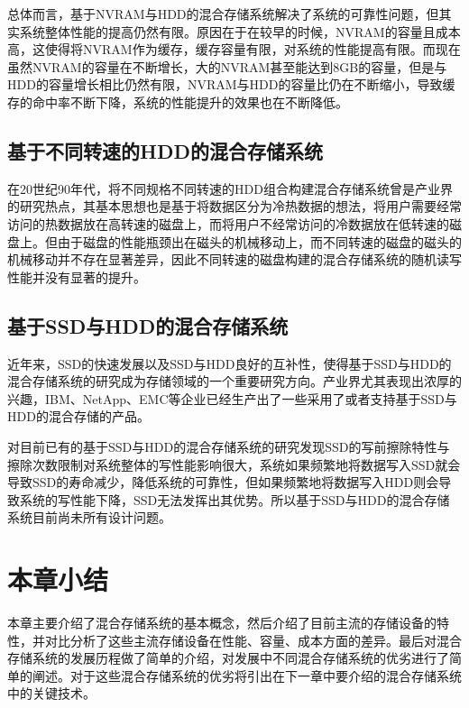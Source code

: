 总体而言，基于NVRAM与HDD的混合存储系统解决了系统的可靠性问题，但其实系统整体性能的提高仍然有限。原因在于在较早的时候，NVRAM的容量且成本高，这使得将NVRAM作为缓存，缓存容量有限，对系统的性能提高有限。而现在虽然NVRAM的容量在不断增长，大的NVRAM甚至能达到8GB的容量，但是与HDD的容量增长相比仍然有限，NVRAM与HDD的容量比仍在不断缩小，导致缓存的命中率不断下降，系统的性能提升的效果也在不断降低。

\subsection{基于不同转速的HDD的混合存储系统}

在20世纪90年代，将不同规格不同转速的HDD组合构建混合存储系统曾是产业界的研究热点，其基本思想也是基于将数据区分为冷热数据的想法，将用户需要经常访问的热数据放在高转速的磁盘上，而将用户不经常访问的冷数据放在低转速的磁盘上。但由于磁盘的性能瓶颈出在磁头的机械移动上，而不同转速的磁盘的磁头的机械移动并不存在显著差异，因此不同转速的磁盘构建的混合存储系统的随机读写性能并没有显著的提升。

\subsection{基于SSD与HDD的混合存储系统}

近年来，SSD的快速发展以及SSD与HDD良好的互补性，使得基于SSD与HDD的混合存储系统的研究成为存储领域的一个重要研究方向。产业界尤其表现出浓厚的兴趣，IBM\cite{ibm2010ds8000}、NetApp\cite{netapp}、EMC\cite{laliberte2009automate}等企业已经生产出了一些采用了或者支持基于SSD与HDD的混合存储的产品。

对目前已有的基于SSD与HDD的混合存储系统的研究发现SSD的写前擦除特性与擦除次数限制对系统整体的写性能影响很大，系统如果频繁地将数据写入SSD就会导致SSD的寿命减少，降低系统的可靠性，但如果频繁地将数据写入HDD则会导致系统的写性能下降，SSD无法发挥出其优势。所以基于SSD与HDD的混合存储系统目前尚未所有设计问题。

\section{本章小结}

本章主要介绍了混合存储系统的基本概念，然后介绍了目前主流的存储设备的特性，并对比分析了这些主流存储设备在性能、容量、成本方面的差异。最后对混合存储系统的发展历程做了简单的介绍，对发展中不同混合存储系统的优劣进行了简单的阐述。对于这些混合存储系统的优劣将引出在下一章中要介绍的混合存储系统中的关键技术。